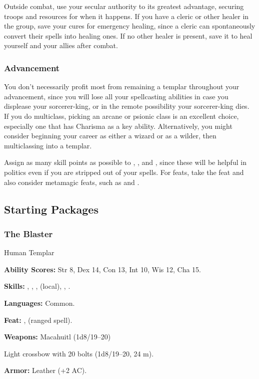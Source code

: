 Outside combat, use your secular authority to its greatest advantage, securing troops and resources for when it happens. If you have a cleric or other healer in the group, save your cures for emergency healing, since a cleric can spontaneously convert their spells into healing ones. If no other healer is present, save it to heal yourself and your allies after combat.

\subsubsection{Advancement}
You don't necessarily profit most from remaining a templar throughout your advancement, since you will lose all your spellcasting abilities in case you displease your sorcerer-king, or in the remote possibility your sorcerer-king dies. If you do multiclass, picking an arcane or psionic class is an excellent choice, especially one that has Charisma as a key ability. Alternatively, you might consider beginning your career as either a wizard or as a wilder, then multiclassing into a templar.

Assign as many skill points as possible to , , and , since these will be helpful in politics even if you are stripped out of your spells. For feats, take the  feat and also consider metamagic feats, such as  and .


\subsection{Starting Packages}
\subsubsection{The Blaster}
Human Templar

\textbf{Ability Scores:} Str 8, Dex 14, Con 13, Int 10, Wis 12, Cha 15.

\textbf{Skills:} , , ,  (local), , .

\textbf{Languages:} Common.

\textbf{Feat:} ,  (ranged spell).

\textbf{Weapons:} Macahuitl (1d8/19--20)

Light crossbow with 20 bolts (1d8/19--20, 24 m).

\textbf{Armor:} Leather (+2 AC).


